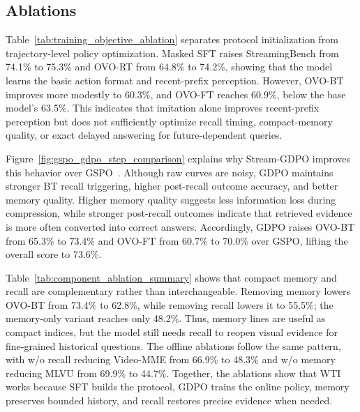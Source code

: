 \subsection{Ablations}

Table~\ref{tab:training_objective_ablation} separates protocol initialization from trajectory-level policy optimization.
Masked SFT raises StreamingBench from 74.1\% to 75.3\% and OVO-RT from 64.8\% to 74.2\%, showing that the model learns the basic action format and recent-prefix perception.
However, OVO-BT improves more modestly to 60.3\%, and OVO-FT reaches 60.9\%, below the base model's 63.5\%.
This indicates that imitation alone improves recent-prefix perception but does not sufficiently optimize recall timing, compact-memory quality, or exact delayed answering for future-dependent queries.

Figure~\ref{fig:gspo_gdpo_step_comparison} explains why Stream-GDPO improves this behavior over GSPO~\citep{zheng2025gspo}.
Although raw curves are noisy, GDPO maintains stronger BT recall triggering, higher post-recall outcome accuracy, and better memory quality.
Higher memory quality suggests less information loss during compression, while stronger post-recall outcomes indicate that retrieved evidence is more often converted into correct answers.
Accordingly, GDPO raises OVO-BT from 65.3\% to 73.4\% and OVO-FT from 60.7\% to 70.0\% over GSPO, lifting the overall score to 73.6\%.

Table~\ref{tab:component_ablation_summary} shows that compact memory and recall are complementary rather than interchangeable.
Removing memory lowers OVO-BT from 73.4\% to 62.8\%, while removing recall lowers it to 55.5\%; the memory-only variant reaches only 48.2\%.
Thus, memory lines are useful as compact indices, but the model still needs recall to reopen visual evidence for fine-grained historical questions.
The offline ablations follow the same pattern, with w/o recall reducing Video-MME from 66.9\% to 48.3\% and w/o memory reducing MLVU from 69.9\% to 44.7\%.
Together, the ablations show that WTI works because SFT builds the protocol, GDPO trains the online policy, memory preserves bounded history, and recall restores precise evidence when needed.

\FloatBarrier
